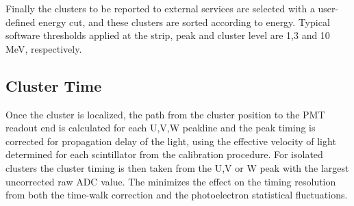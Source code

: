 Finally the clusters to be reported to external services are selected with a user-defined energy cut, and these clusters are sorted according to energy. Typical software thresholds applied at the strip, peak and cluster level are 1,3 and 10 MeV, respectively. 

\subsection {Cluster Time}

Once the cluster is localized, the path from the cluster position to the PMT readout end is calculated for each U,V,W peakline and the peak timing is corrected for propagation delay of the light, using the effective velocity of light determined for each scintillator from the calibration procedure.  For isolated clusters the cluster timing is then taken from the U,V or W peak with the largest uncorrected raw ADC value.  The minimizes the effect on the timing resolution from both the time-walk correction and the photoelectron statistical fluctuations.

